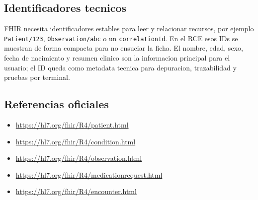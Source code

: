 \subsection{Identificadores tecnicos}

FHIR necesita identificadores estables para leer y relacionar recursos, por
ejemplo \texttt{Patient/123}, \texttt{Observation/abc} o un
\texttt{correlationId}. En el RCE esos IDs se muestran de forma compacta para no
ensuciar la ficha. El nombre, edad, sexo, fecha de nacimiento y resumen clinico
son la informacion principal para el usuario; el ID queda como metadata tecnica
para depuracion, trazabilidad y pruebas por terminal.

\subsection{Referencias oficiales}

\begin{itemize}
  \item \url{https://hl7.org/fhir/R4/patient.html}
  \item \url{https://hl7.org/fhir/R4/condition.html}
  \item \url{https://hl7.org/fhir/R4/observation.html}
  \item \url{https://hl7.org/fhir/R4/medicationrequest.html}
  \item \url{https://hl7.org/fhir/R4/encounter.html}
\end{itemize}
